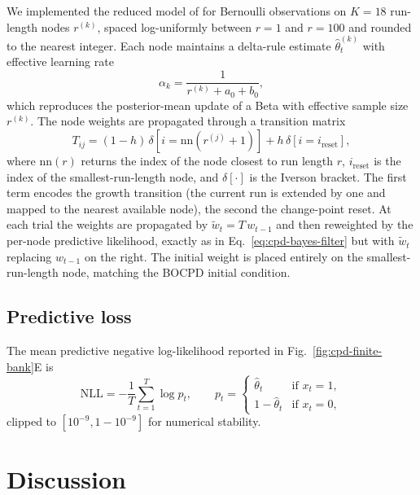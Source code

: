 We implemented the reduced model of \citet{Wilson2013} for Bernoulli observations on $K=18$ run-length nodes $r^{(k)}$, spaced log-uniformly between $r=1$ and $r=100$ and rounded to the nearest integer. Each node maintains a delta-rule estimate $\hat\theta_t^{(k)}$ with effective learning rate
\begin{equation}
    \alpha_k = \frac{1}{r^{(k)} + a_0 + b_0},
    \label{eq:wilson-alpha}
\end{equation}
which reproduces the posterior-mean update of a Beta with effective sample size $r^{(k)}$. The node weights are propagated through a transition matrix
\begin{equation}
    T_{ij} = (1-h)\,\delta\!\left[i = \mathrm{nn}(r^{(j)}+1)\right] + h\,\delta\!\left[i = i_\text{reset}\right],
    \label{eq:wilson-T}
\end{equation}
where $\mathrm{nn}(r)$ returns the index of the node closest to run length $r$, $i_\text{reset}$ is the index of the smallest-run-length node, and $\delta[\cdot]$ is the Iverson bracket. The first term encodes the growth transition (the current run is extended by one and mapped to the nearest available node), the second the change-point reset. At each trial the weights are propagated by $\tilde w_t = T\,w_{t-1}$ and then reweighted by the per-node predictive likelihood, exactly as in Eq.~\ref{eq:cpd-bayes-filter} but with $\tilde w_t$ replacing $w_{t-1}$ on the right. The initial weight is placed entirely on the smallest-run-length node, matching the BOCPD initial condition.

\subsection{Predictive loss}

The mean predictive negative log-likelihood reported in Fig.~\ref{fig:cpd-finite-bank}E is
\begin{equation}
    \mathrm{NLL} = -\frac{1}{T}\sum_{t=1}^{T} \log p_t,
    \qquad
    p_t = \begin{cases} \hat\theta_t & \text{if } x_t = 1, \\ 1-\hat\theta_t & \text{if } x_t = 0, \end{cases}
\end{equation}
clipped to $[10^{-9}, 1-10^{-9}]$ for numerical stability.

\section{Discussion}

